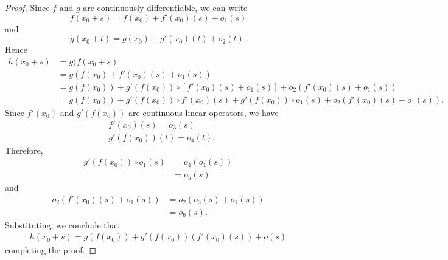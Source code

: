 \documentclass[12pt,reqno]{amsart}
\numberwithin{equation}{section}  %
\begin{document}
\begin{proof} Since $f$ and $g$ are continuously differentiable, we can write
\begin{equation*}
f(x_0 + s) = f(x_0) + f'(x_0)(s) + o_{1}(s)
\end{equation*}
and
\begin{equation*}
g(x_0 + t) = g(x_0) + g'(x_0)(t)+ o_{2}(t).
\end{equation*}
Hence
\begin{equation}
\label{pre-order}
\begin{split}
h(x_0 + s) &= g(f(x_0 +s)
\\
&= g(f(x_0) + f'(x_0)(s) + o_{1}(s))
\\
&= g(f(x_0)) + g'(f(x_0)) \circ [f'(x_0)(s) + o_{1}(s)] 
+ o_{2}(f'(x_0)(s) + o_{1}(s))
\\
&= g(f(x_0)) + g'(f(x_0)) \circ f'(x_0)(s) +
g'(f(x_0)) \circ o_{1}(s) + o_{2}(f'(x_0)(s) + o_{1}(s)).
\end{split}
\end{equation}
Since $f'(x_0)$
and $g'(f(x_0))$ are continuous linear operators, we have
\begin{equation*}
\begin{split}
&  f'(x_0)(s)
= o_{3}(s)
\\
& g'(f(x_0))(t) = o_{4}(t).
\end{split}
\end{equation*}
Therefore,
%
%
\begin{equation*}
\begin{split}
g'(f(x_0)) \circ o_{1}(s)
& = o_{4}(o_{1}(s))
\\
& = o_{5}(s)
\end{split}
\end{equation*}
%
%
and
%
%
\begin{equation*}
\begin{split}
o_{2}(f'(x_0)(s) + o_{1}(s))
& = o_{2}(o_{3}(s) + o_{1}(s))
\\
& =o_{6}(s).
\end{split}
\end{equation*}
%
%
Substituting, we conclude that
\begin{equation*}
\begin{split}
h(x_0 + s) = g(f(x_0)) + g'(f(x_0))(f'(x_0)(s)) +
o(s)
\end{split}
\end{equation*}
completing the proof. 
\end{proof}
%
%
%
%
\end{document}
